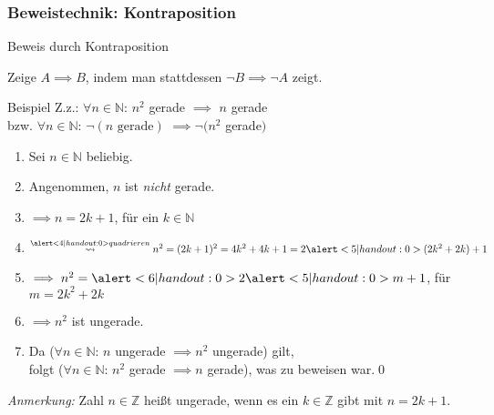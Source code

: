 \subsubsection{Beweistechnik: Kontraposition}
\begin{frame}[fragile]{Beweis durch Kontraposition}
    \begin{alertblock}{Zeige $A\implies B$, indem man stattdessen $\neg B \implies\neg A$ zeigt.}
    \end{alertblock}
    \begin{exampleblock}{Beispiel}
    Z.z.: \alert<7|handout:0>{\alert<1|handout:0>{$\forall n\in\mathbb{N}$:} $n^2$ gerade $\implies$\alert<2|handout:0>{ $n$ gerade}} \\
    \qquad bzw. \alert<1|handout:0>{$\forall n\in\mathbb{N}$:} \alert<2|handout:0>{$\neg(n \text{ gerade})$} $\implies \neg(n^2$ gerade$)$ 
    \begin{enumerate}
        \item\alert<1|handout:0>{Sei $n \in \mathbb{N}$ beliebig.}
        \item\alert<2|handout:0>{Angenommen, $n$ ist \emph{nicht} gerade.}
        \item\alert<3|handout:0>{$\implies n=2k+1$, für ein $k \in \mathbb{N}$}
        \item $\overset{\alert<4|handout:0>{quadrieren}}{\; \leadsto \;} n^2 = (2k+1)^2 = 4k^2+4k+1 = 2\alert<5|handout:0>{(2k^2+2k)}+1$
        \item $\implies n^2= \alert<6|handout:0>{2\alert<5|handout:0>{m}+1}$, für $m=2k^2+2k$
        \item $\implies n^2$ ist \alert<6|handout:0>{ungerade}.
        \item Da ($\forall n\in\mathbb{N}$: $n$ ungerade $\implies n^2$ ungerade) gilt, \\
        folgt \alert<7|handout:0>{($\forall n\in\mathbb{N}$: $n^2$ gerade $\implies n$ gerade)}, was zu beweisen war.\qed\;
    \end{enumerate}
    \end{exampleblock}
    \footnotesize{\alert<3,6|handout:0>{\emph{Anmerkung:}} Zahl $n\in\mathbb{Z}$ heißt ungerade, wenn es ein $k\in\mathbb{Z}$ gibt mit $n=2k+1$.}
\end{frame}

